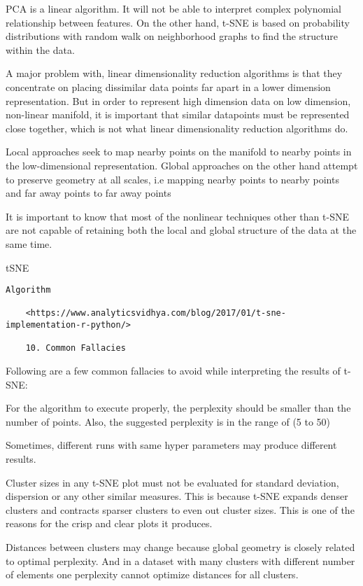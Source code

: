\documentclass[
]{book}
\begin{document}
PCA is a linear algorithm. It will not be able to interpret complex polynomial relationship between features. On the other hand, t-SNE is based on probability distributions with random walk on neighborhood graphs to find the structure within the data.

A major problem with, linear dimensionality reduction algorithms is that they concentrate on placing dissimilar data points far apart in a lower dimension representation. But in order to represent high dimension data on low dimension, non-linear manifold, it is important that similar datapoints must be represented close together, which is not what linear dimensionality reduction algorithms do.

Local approaches seek to map nearby points on the manifold to nearby points in the low-dimensional representation. Global approaches on the other hand attempt to preserve geometry at all scales, i.e mapping nearby points to nearby points and far away points to far away points

It is important to know that most of the nonlinear techniques other than t-SNE are not capable of retaining both the local and global structure of the data at the same time.

tSNE

\begin{verbatim}
Algorithm

    <https://www.analyticsvidhya.com/blog/2017/01/t-sne-implementation-r-python/>

    10. Common Fallacies
\end{verbatim}

Following are a few common fallacies to avoid while interpreting the results of t-SNE:

For the algorithm to execute properly, the perplexity should be smaller than the number of points. Also, the suggested perplexity is in the range of (5 to 50)

Sometimes, different runs with same hyper parameters may produce different results.

Cluster sizes in any t-SNE plot must not be evaluated for standard deviation, dispersion or any other similar measures. This is because t-SNE expands denser clusters and contracts sparser clusters to even out cluster sizes. This is one of the reasons for the crisp and clear plots it produces.

Distances between clusters may change because global geometry is closely related to optimal perplexity. And in a dataset with many clusters with different number of elements one perplexity cannot optimize distances for all clusters.
\end{document}
